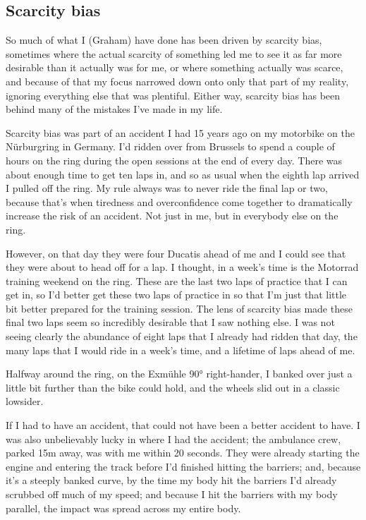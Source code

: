 \subsection{Scarcity bias}
So much of what I (Graham) have done has been driven by scarcity bias, sometimes where the actual scarcity of something led me to see it as far more desirable than it actually was for me, or where something actually was scarce, and because of that my focus narrowed down onto only that part of my reality, ignoring everything else that was plentiful. Either way, scarcity bias has been behind many of the mistakes I've made in my life.


\begin{longstoryblock}
Scarcity bias was part of an accident I had 15 years ago on my motorbike on the N\"{u}rburgring in Germany. I'd ridden over from Brussels to spend a couple of hours on the ring during the open sessions at the end of every day. There was about enough time to get ten laps in, and so as usual when the eighth lap arrived I pulled off the ring. My rule always was to never ride the final lap or two, because that's when tiredness and overconfidence come together to dramatically increase the risk of an accident. Not just in me, but in everybody else on the ring.


However, on that day they were four Ducatis ahead of me and I could see that they were about to head off for a lap. I thought, in a week's time is the Motorrad training weekend on the ring. These are the last two laps of practice that I can get in, so I'd better get these two laps of practice in so that I'm just that little bit better prepared for the training session. The lens of scarcity bias made these final two laps seem so incredibly desirable that I saw nothing else. I was not seeing clearly the abundance of eight laps that I already had ridden that day, the many laps that I would ride in a week’s time, and a lifetime of laps ahead of me.


Halfway around the ring, on the Exm{\"u}hle 90° right-hander, I banked over just a little bit further than the bike could hold, and the wheels slid out in a classic lowsider. 


If I had to have an accident, that could not have been a better accident to have. I was also unbelievably lucky in where I had the accident; the ambulance crew, parked 15m away, was with me within 20 seconds. They were already starting the engine and entering the track before I'd finished hitting the barriers; and, because it's a steeply banked curve, by the time my body hit the barriers I'd already scrubbed off much of my speed; and because I hit the barriers with my body parallel, the impact was spread across my entire body.



\end{longstoryblock}
